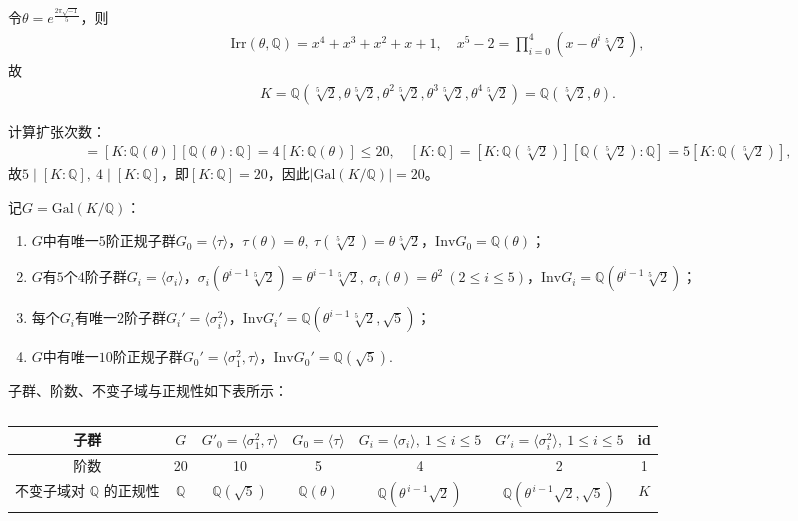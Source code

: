\documentclass[../../main.tex]{subfiles}%
\begin{document}
\begin{solution}

令$\theta=e^{\frac{2\pi\sqrt{-1}}{5}}$，则
\begin{align*}
\mathrm{Irr}(\theta,\mathbb{Q})=x^4+x^3+x^2+x+1,\quad x^5-2=\prod\limits_{i=0}^4(x-\theta^i\sqrt[5]{2}),
\end{align*}
故
\begin{align*}
K=\mathbb{Q}(\sqrt[5]{2},\theta\sqrt[5]{2},\theta^2\sqrt[5]{2},\theta^3\sqrt[5]{2},\theta^4\sqrt[5]{2})=\mathbb{Q}(\sqrt[5]{2},\theta).
\end{align*}

计算扩张次数：
\begin{align*}
[K:\mathbb{Q}]=[K:\mathbb{Q}(\theta)][\mathbb{Q}(\theta):\mathbb{Q}]=4[K:\mathbb{Q}(\theta)]\leqslant20,\quad [K:\mathbb{Q}]=[K:\mathbb{Q}(\sqrt[5]{2})][\mathbb{Q}(\sqrt[5]{2}):\mathbb{Q}]=5[K:\mathbb{Q}(\sqrt[5]{2})],
\end{align*}
故$5\mid[K:\mathbb{Q}],\ 4\mid[K:\mathbb{Q}]$，即$[K:\mathbb{Q}]=20$，因此$|\mathrm{Gal}(K/\mathbb{Q})|=20$。

记$G=\mathrm{Gal}(K/\mathbb{Q})$：
\begin{enumerate}[(1)]
\item $G$中有唯一$5$阶正规子群$G_0=\langle\tau\rangle$，$\tau(\theta)=\theta,\ \tau(\sqrt[5]{2})=\theta\sqrt[5]{2}$，$\mathrm{Inv}G_0=\mathbb{Q}(\theta)$；
\item $G$有$5$个$4$阶子群$G_i=\langle\sigma_i\rangle$，$\sigma_i(\theta^{i-1}\sqrt[5]{2})=\theta^{i-1}\sqrt[5]{2},\ \sigma_i(\theta)=\theta^2\ (2\leqslant i\leqslant5)$，$\mathrm{Inv}G_i=\mathbb{Q}(\theta^{i-1}\sqrt[5]{2})$；
\item 每个$G_i$有唯一$2$阶子群$G_i'=\langle\sigma_i^2\rangle$，$\mathrm{Inv}G_i'=\mathbb{Q}(\theta^{i-1}\sqrt[5]{2},\sqrt{5})$；
\item $G$中有唯一$10$阶正规子群$G_0'=\langle\sigma_1^2,\tau\rangle$，$\mathrm{Inv}G_0'=\mathbb{Q}(\sqrt{5})$.
\end{enumerate}

子群、阶数、不变子域与正规性如下表所示：
\begin{table}[H]
\centering
\caption{}
\renewcommand{\arraystretch}{1.2}
\begin{tabular}{ccccccc}
\toprule
子群 & $G$ & $G'_0 = \langle \sigma_1^2, \tau \rangle$ & $G_0 = \langle \tau \rangle$ & $G_i = \langle \sigma_i \rangle,\ 1 \leq i \leq 5$ & $G'_i = \langle \sigma_i^2 \rangle,\ 1 \leq i \leq 5$ & id \\
\midrule
阶数 & 20 & 10 & 5 & 4 & 2 & 1 \\
\midrule
不变子域对 $\mathbb{Q}$ 的正规性 & $\mathbb{Q}$ & $\mathbb{Q}(\sqrt{5})$ & $\mathbb{Q}(\theta)$ & $\mathbb{Q}(\theta^{\,i-1}\sqrt{2})$ & $\mathbb{Q}(\theta^{\,i-1}\sqrt{2},\sqrt{5})$ & $K$ \\
\bottomrule
\end{tabular}
\end{table}

\end{solution}
\end{document}
